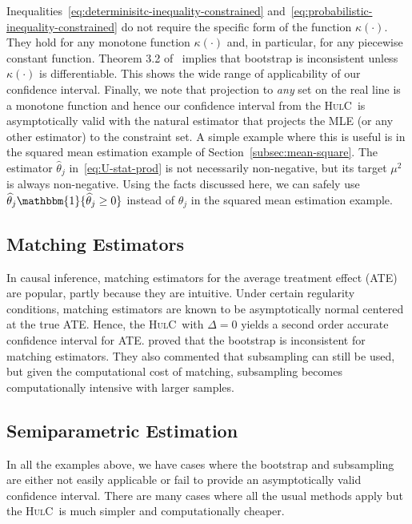 \documentclass{article}
\newcommand{\hulc}{\textsc{HulC}~}
\numberwithin{myalgctr}{section}
\begin{document}
Inequalities~\eqref{eq:determinisitc-inequality-constrained} and~\eqref{eq:probabilistic-inequality-constrained} do not require the specific form of the function $\kappa(\cdot)$. They hold for any monotone function $\kappa(\cdot)$ and, in particular, for any piecewise constant function. Theorem 3.2 of~\cite{fang2019inference} implies that bootstrap is inconsistent unless $\kappa(\cdot)$ is differentiable. This shows the wide range of applicability of our confidence interval. Finally, we note that projection to \emph{any} set on the real line is a monotone function and hence our confidence interval from the \hulc is asymptotically valid with the natural estimator that projects the MLE (or any other estimator) to the constraint set. A simple example where this is useful is in the squared mean estimation example of Section~\ref{subsec:mean-square}. The estimator $\widehat{\theta}_j$ in~\eqref{eq:U-stat-prod} is not necessarily non-negative, but its target $\mu^2$ is always non-negative. Using the facts discussed here, we can safely use $\widehat{\theta}_j\mathbbm{1}\{\widehat{\theta}_j \ge 0\}$ instead of $\widehat{\theta}_j$ in the squared mean estimation example.
\subsection{Matching Estimators}
In causal inference, matching estimators for the average treatment effect (ATE) are popular, partly because they are intuitive. Under certain regularity conditions, matching estimators are known to be asymptotically normal centered at the true ATE. Hence, the \hulc with $\Delta = 0$ yields a second order accurate confidence interval for ATE. \cite{abadie2008failure} proved that the bootstrap is inconsistent for matching estimators. They also commented that subsampling can still be used, but given the computational cost of matching, subsampling becomes computationally intensive with larger samples. 
\subsection{Semiparametric Estimation}
In all the examples above, we have cases where the bootstrap and subsampling are either not easily applicable or fail to provide an asymptotically valid confidence interval. There are many cases where all the usual methods apply but the \hulc is much simpler and computationally cheaper.
\end{document}
